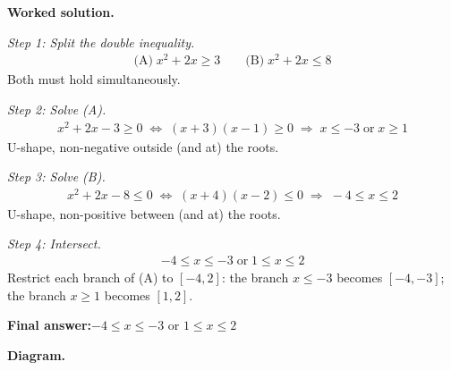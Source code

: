 \documentclass[11pt]{article}
\begin{document}
\textbf{Worked solution.}

\textit{Step 1: Split the double inequality.}
\[\begin{gathered}
\text{(A)}\; x^2 + 2x \geq 3 \qquad \text{(B)}\; x^2 + 2x \leq 8
\end{gathered}\]
Both must hold simultaneously.

\textit{Step 2: Solve (A).}
\[\begin{gathered}
x^2 + 2x - 3 \geq 0 \;\Longleftrightarrow\; (x + 3)(x - 1) \geq 0 \;\Longrightarrow\; x \leq -3 \;\text{or}\; x \geq 1
\end{gathered}\]
U-shape, non-negative outside (and at) the roots.

\textit{Step 3: Solve (B).}
\[\begin{gathered}
x^2 + 2x - 8 \leq 0 \;\Longleftrightarrow\; (x + 4)(x - 2) \leq 0 \;\Longrightarrow\; -4 \leq x \leq 2
\end{gathered}\]
U-shape, non-positive between (and at) the roots.

\textit{Step 4: Intersect.}
\[\begin{gathered}
-4 \leq x \leq -3 \;\text{or}\; 1 \leq x \leq 2
\end{gathered}\]
Restrict each branch of (A) to \( [-4, 2] \): the branch \( x \leq -3 \) becomes \( [-4, -3] \); the branch \( x \geq 1 \) becomes \( [1, 2] \).

\begin{answerbox}
\textbf{Final answer:}\quad \(\displaystyle -4 \leq x \leq -3\) or \(\displaystyle 1 \leq x \leq 2\)
\end{answerbox}
\textbf{Diagram.}
\end{document}
